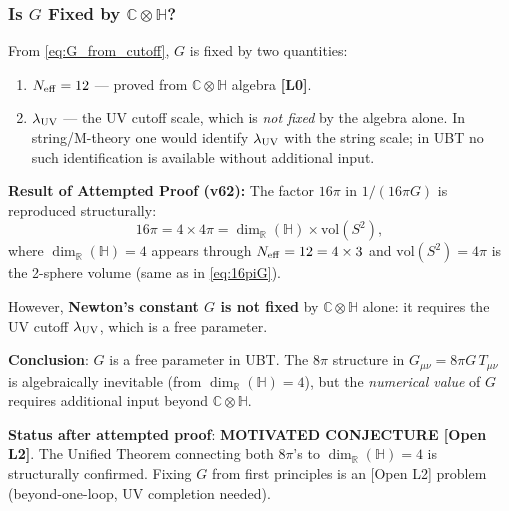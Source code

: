 \documentclass[12pt,a4paper]{article}
\theoremstyle{definition}
\theoremstyle{remark}
\begin{document}
\subsubsection{Is $G$ Fixed by $\mathbb{C}\otimes\mathbb{H}$?}

From \eqref{eq:G_from_cutoff}, $G$ is fixed by two quantities:
\begin{enumerate}
  \item $N_{\rm eff} = 12$ — proved from $\mathbb{C}\otimes\mathbb{H}$
        algebra \textbf{[L0]}.
  \item $\lambda_{\rm UV}$ — the UV cutoff scale, which is \emph{not fixed}
        by the algebra alone.  In string/M-theory one would identify
        $\lambda_{\rm UV}$ with the string scale; in UBT no such
        identification is available without additional input.
\end{enumerate}

\begin{gapbox}
\textbf{Result of Attempted Proof (v62):}
The factor $16\pi$ in $1/(16\pi G)$ is reproduced structurally:
\[
  16\pi = 4 \times 4\pi = \dim_\mathbb{R}(\mathbb{H}) \times \mathrm{vol}(S^2),
\]
where $\dim_\mathbb{R}(\mathbb{H}) = 4$ appears through $N_{\rm eff} = 12 = 4 \times 3$
and $\mathrm{vol}(S^2) = 4\pi$ is the 2-sphere volume (same as in
\eqref{eq:16piG}).

However, \textbf{Newton's constant $G$ is not fixed} by $\mathbb{C}\otimes\mathbb{H}$
alone: it requires the UV cutoff $\lambda_{\rm UV}$, which is a free parameter.

\medskip
\textbf{Conclusion}: $G$ is a free parameter in UBT.  The $8\pi$ structure
in $G_{\mu\nu} = 8\pi G\,T_{\mu\nu}$ is algebraically inevitable
(from $\dim_\mathbb{R}(\mathbb{H}) = 4$), but the \emph{numerical value}
of $G$ requires additional input beyond $\mathbb{C}\otimes\mathbb{H}$.

\medskip
\textbf{Status after attempted proof}: \textbf{MOTIVATED CONJECTURE [Open L2]}.
The Unified Theorem connecting both $8\pi$'s to $\dim_\mathbb{R}(\mathbb{H}) = 4$
is structurally confirmed.  Fixing $G$ from first principles is an [Open L2]
problem (beyond-one-loop, UV completion needed).
\end{gapbox}
\end{document}
